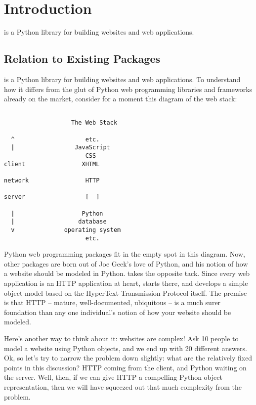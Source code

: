 \chapter{Introduction}

 is a Python library for building websites and web applications.



\section{Relation to Existing Packages}

 is a Python library for building websites and web applications.
To understand how it differs from the glut of Python web programming libraries
and frameworks already on the market, consider for a moment this diagram of the
web stack:

\begin{verbatim}

                   The Web Stack

  ^                    etc.
  |                 JavaScript
                       CSS
client                XHTML

network                HTTP

server                 [  ]

  |                   Python
  |                  database
  v              operating system
                       etc.

\end{verbatim}

Python web programming packages fit in the empty spot in this diagram. Now,
other packages are born out of Joe Geek's love of Python, and his notion of how
a website should be modeled in Python.  takes the opposite tack.
Since every web application is an HTTP application at heart, 
starts there, and develops a simple object model based on the HyperText
Transmission Protocol itself. The premise is that HTTP -- mature,
well-documented, ubiquitous -- is a much surer foundation than any one
individual's notion of how your website should be modeled.

Here's another way to think about it: websites are complex! Ask 10 people to
model a website using Python objects, and we end up with 20 different answers.
Ok, so let's try to narrow the problem down slightly: what are the relatively
fixed points in this discussion? HTTP coming from the client, and Python waiting
on the server. Well, then, if we can give HTTP a compelling Python object
representation, then we will have squeezed out that much complexity from the
problem.




